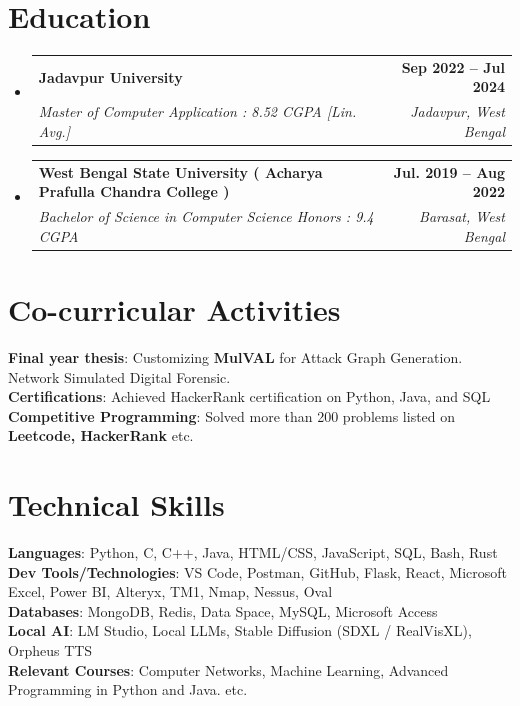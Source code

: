 \documentclass[letterpaper,11pt]{article}
\makeatletter
\newcommand{\resumeSubheading}[4]{
  \vspace{-2pt}\item
    \begin{tabular*}{1.0\textwidth}[t]{l@{\extracolsep{\fill}}r}
      \textbf{#1} & \textbf{\small #2} \\
      \textit{\small#3} & \textit{\small #4} \\
    \end{tabular*}\vspace{-7pt}
}
\newcommand{\resumeSubHeadingListStart}{\begin{itemize}[leftmargin=0.0in, label={}]}
\newcommand{\resumeSubHeadingListEnd}{\end{itemize}}
\makeatother
\begin{document}
\section{Education}
  \resumeSubHeadingListStart
    \resumeSubheading
      {Jadavpur University}{Sep 2022 -- Jul 2024}
      {Master of Computer Application : 8.52 CGPA  [Lin. Avg.]}{Jadavpur, West Bengal}
    \resumeSubheading
      {West Bengal State University ( Acharya Prafulla Chandra College )}{Jul. 2019 -- Aug 2022}
      {Bachelor of Science in Computer Science Honors : 9.4 CGPA}{Barasat, West Bengal}
    
  \resumeSubHeadingListEnd
\vspace{-13pt}

\section{Co-curricular Activities}
\vspace{-0pt}
\textbf{Final year thesis}{: Customizing \textbf{MulVAL} for Attack Graph Generation. Network Simulated Digital Forensic.}
\\
\textbf{Certifications}{: Achieved HackerRank certification on Python, Java, and SQL}
\\
\textbf{Competitive Programming}{: Solved more than 200 problems listed on \textbf{Leetcode, HackerRank} etc.}
\\
\vspace{-13pt}

\section{Technical Skills}
     \textbf{Languages}{: Python, C, C++, Java, HTML/CSS, JavaScript, SQL, Bash, Rust} \\
     \textbf{Dev Tools/Technologies}{: VS Code, Postman, GitHub, Flask,  React, Microsoft Excel, Power BI, Alteryx, TM1, Nmap, Nessus, Oval} \\
     \textbf{Databases}{: MongoDB, Redis, Data Space, MySQL, Microsoft Access} \\
     \textbf{Local AI}{: LM Studio, Local LLMs, Stable Diffusion (SDXL / RealVisXL), Orpheus TTS} \\
     \textbf{Relevant Courses}{: Computer Networks, Machine Learning, Advanced Programming in Python and Java. etc.}
\end{document}
